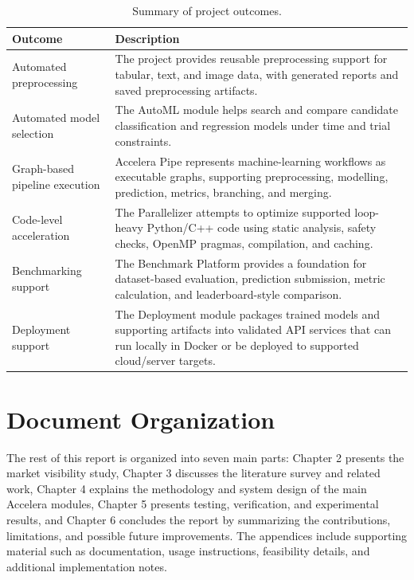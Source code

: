 \documentclass[12pt,a4paper]{report}
\newcommand{\acceleraTableStyle}{%
\small
\renewcommand{\arraystretch}{1.15}
\setlength{\tabcolsep}{4pt}%
}
\begin{document}
\begin{table}[!htbp]
\centering
\acceleraTableStyle
\caption{Summary of project outcomes.}
\label{tab:intro-outcomes}
\begin{tabular}{p{}p{}}
\toprule
\textbf{Outcome} & \textbf{Description} \\
\midrule

Automated preprocessing &
The project provides reusable preprocessing support for tabular, text, and image
data, with generated reports and saved preprocessing artifacts. \\
\midrule

Automated model selection &
The AutoML module helps search and compare candidate classification and
regression models under time and trial constraints. \\
\midrule

Graph-based pipeline execution &
Accelera Pipe represents machine-learning workflows as executable graphs,
supporting preprocessing, modelling, prediction, metrics, branching, and merging. \\
\midrule

Code-level acceleration &
The Parallelizer attempts to optimize supported loop-heavy Python/C++ code using
static analysis, safety checks, OpenMP pragmas, compilation, and caching. \\
\midrule

Benchmarking support &
The Benchmark Platform provides a foundation for dataset-based evaluation,
prediction submission, metric calculation, and leaderboard-style comparison. \\
\midrule

Deployment support &
The Deployment module packages trained models and supporting artifacts into
validated API services that can run locally in Docker or be deployed to
supported cloud/server targets. \\

\bottomrule
\end{tabular}
\end{table}

\newpage
\section{Document Organization}

The rest of this report is organized into seven main parts: Chapter 2 presents the market visibility study, 
Chapter 3 discusses the literature survey and related work, Chapter 4 explains the methodology and system 
design of the main Accelera modules, Chapter 5 presents testing, verification, and experimental results, 
and Chapter 6 concludes the report by summarizing the contributions, limitations, and possible future improvements. 
The appendices include supporting material such as documentation, usage instructions, feasibility details, 
and additional implementation notes.
\end{document}
